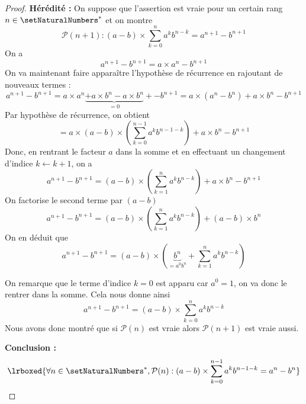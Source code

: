 \begin{proof}
\textbf{Hérédité :} On suppose que l'assertion est vraie pour un certain rang $n \in \setNaturalNumbers^*$ et on montre 
\[
\mathcal{P}(n+1) :
(a-b)\times \displaystyle\sum\limits_{k=0}^{n} a^k b^{n - k} 
=  a^{n+1}  - b^{n+1}
\]
On a 
\[
a^{n+1}  - b^{n+1} 
= a \times a^{n}  - b^{n+1}
\]
On va maintenant faire apparaître l'hypothèse de récurrence en rajoutant de nouveaux termes :
\[
a^{n+1}  - b^{n+1} 
=a \times a^{n} \underbrace{+ a \times b^{n} - a \times b^{n}}_{=0} +  - b^{n+1}
=a \times (a^{n} - b^{n}) + a \times b^{n} - b^{n+1}
\]
Par hypothèse de récurrence, on obtient 
\[
= a \times (a-b)\times \left(\displaystyle\sum\limits_{k=0}^{n-1} a^k b^{n - 1 - k}\right) + a \times b^{n} - b^{n+1}
\]
Donc, en rentrant le facteur $a$ dans la somme et en effectuant un changement d'indice $k \leftarrow k+1$, on a
\[
a^{n+1}  - b^{n+1} = (a-b)\times \left(\displaystyle\sum\limits_{k=1}^{n} a^{k} b^{n  - k}\right) +  a \times b^{n} - b^{n+1}
\]
On factorise le second terme par $(a-b)$
\[
a^{n+1}  - b^{n+1}
= (a-b)\times \left(\displaystyle\sum\limits_{k=1}^{n} a^{k} b^{n  - k}\right) + (a - b) \times b^{n}
\]
On en déduit que 
\[
a^{n+1}  - b^{n+1}
= (a-b)\times \left(\underbrace{b^{n}}_{=a^0 b^n} + \displaystyle\sum\limits_{k=1}^{n} a^{k} b^{n  - k}\right)
\]

On remarque que le terme d'indice $k=0$ est apparu car $a^0=1$, on va donc le rentrer dans la somme. Cela nous donne ainsi
\[
a^{n+1}  - b^{n+1}
= (a-b)\times \displaystyle\sum\limits_{k=0}^{n} a^k b^{n - k}
\]
Nous avons donc montré que si $\mathcal{P}(n)$ est vraie alors $\mathcal{P}(n+1)$ est vraie aussi.

\textbf{Conclusion :}  
\[
\lrboxed{\forall n \in \setNaturalNumbers^*,
\mathcal{P}(n) : 
(a-b)\times \displaystyle\sum\limits_{k=0}^{n-1} a^k b^{n - 1 - k}  
=  a^{n}  - b^{n}}
\]
\end{proof}
